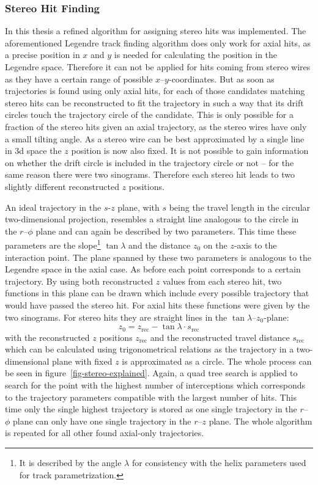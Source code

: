 \subsubsection{Stereo Hit Finding}

In this thesis a refined algorithm for assigning stereo hits was implemented. The aforementioned Legendre track finding algorithm does only work for axial hits, as a precise position in $x$ and $y$ is needed for calculating the position in the Legendre space. Therefore it can not be applied for hits coming from stereo wires as they have a certain range of possible $x$--$y$-coordinates. But as soon as trajectories is found using only axial hits, for each of those candidates matching stereo hits can be reconstructed to fit the trajectory in such a way that its drift circles touch the trajectory circle of the candidate. This is only possible for a fraction of the stereo hits given an axial trajectory, as the stereo wires have only a small tilting angle. As a stereo wire can be best approximated by a single line in 3d space the $z$ position is now also fixed. It is not possible to gain information on whether the drift circle is included in the trajectory circle or not -- for the same reason there were two sinograms. Therefore each stereo hit leads to two slightly different reconstructed $z$ positions. 

An ideal trajectory in the $s$-$z$ plane, with $s$ being the travel length in the circular two-dimensional projection, resembles a straight line analogous to the circle in the $r$--$\phi$ plane and can again be described by two parameters. This time these parameters are the slope\footnote{It is described by the angle $\lambda$ for consistency with the helix parameters used for track parametrization.} $\tan \lambda$ and the distance $z_0$ on the $z$-axis to the interaction point. The plane spanned by these two parameters is analogous to the Legendre space in the axial case. As before each point corresponds to a certain trajectory. By using both reconstructed $z$ values from each stereo hit, two functions in this plane can be drawn which include every possible trajectory that would have passed the stereo hit. For axial hits these functions were given by the two sinograms. For stereo hits they are straight lines in the $\tan \lambda$--$z_0$-plane:
$$ z_0 = z_\text{rec} - \tan \lambda \cdot s_\text{rec} $$
with the reconstructed $z$ positions $z_\text{rec}$ and the reconstructed travel distance $s_\text{rec}$ which can be calculated using trigonometrical relations as the trajectory in a two-dimensional plane with fixed $z$ is approximated as a circle. The whole process can be seen in figure~\ref{fig-stereo-explained}. Again, a quad tree search is applied to search for the point with the highest number of interceptions which corresponds to the trajectory parameters compatible with the largest number of hits. This time only the single highest trajectory is stored as one single trajectory in the $r$--$\phi$ plane can only have one single trajectory in the $r$--$z$ plane. The whole algorithm is repeated for all other found axial-only trajectories. 

